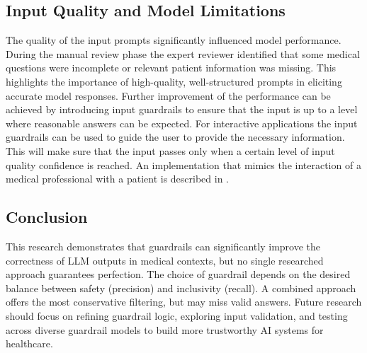 \subsection{Input Quality and Model Limitations}
The quality of the input prompts significantly influenced model performance.
During the manual review phase the expert reviewer identified that some medical questions were incomplete or relevant patient information was missing.
This highlights the importance of high-quality, well-structured prompts in eliciting accurate model responses.
Further improvement of the performance can be achieved by introducing input guardrails to ensure that the input is up to a level where reasonable answers can be expected.
For interactive applications the input guardrails can be used to guide the user to provide the necessary information.
This will make sure that the input passes only when a certain level of input quality confidence is reached.
An implementation that mimics the interaction of a medical professional with a patient is described in \citep{hsu2025medplan}.

\subsection*{Conclusion}
This research demonstrates that guardrails can significantly improve the correctness of LLM outputs in medical contexts, but no single researched approach guarantees perfection.
The choice of guardrail depends on the desired balance between safety (precision) and inclusivity (recall).
A combined approach offers the most conservative filtering, but may miss valid answers.
Future research should focus on refining guardrail logic, exploring input validation, and testing across diverse guardrail models to build more trustworthy AI systems for healthcare.
